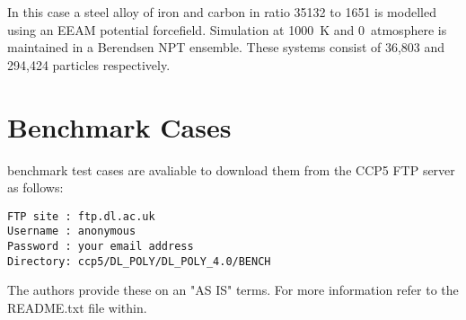 In this case a steel alloy of iron and carbon in ratio
35132 to 1651 is modelled using an EEAM potential forcefield.
Simulation at 1000~K and 0~atmosphere is maintained in a Berendsen NPT
ensemble.  These systems consist of 36,803 and 294,424
particles respectively.

\section{Benchmark Cases}

\D benchmark test cases are avaliable to download them from the CCP5 FTP
server as follows:

\begin{verbatim}
FTP site : ftp.dl.ac.uk
Username : anonymous
Password : your email address
Directory: ccp5/DL_POLY/DL_POLY_4.0/BENCH
\end{verbatim}

The \D authors provide these on an "AS IS" terms.  For more information
refer to the README.txt file within.
